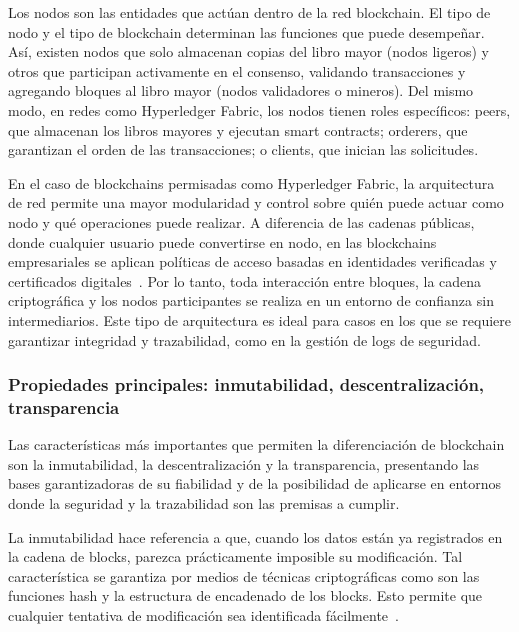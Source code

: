 Los nodos son las entidades que actúan dentro de la red blockchain. El tipo de nodo y el tipo de blockchain determinan las funciones que puede desempeñar. Así, existen nodos que solo almacenan copias del libro mayor (nodos ligeros) y otros que participan activamente en el consenso, validando transacciones y agregando bloques al libro mayor (nodos validadores o mineros)\cite{Swan2015}. Del mismo modo, en redes como Hyperledger Fabric, los nodos tienen roles específicos: peers, que almacenan los libros mayores y ejecutan smart contracts; orderers, que garantizan el orden de las transacciones; o clients, que inician las solicitudes\cite{HyperledgerFabric2.5KeyConcepts}.

En el caso de blockchains permisadas como Hyperledger Fabric, la arquitectura de red permite una mayor modularidad y control sobre quién puede actuar como nodo y qué operaciones puede realizar. A diferencia de las cadenas públicas, donde cualquier usuario puede convertirse en nodo, en las blockchains empresariales se aplican políticas de acceso basadas en identidades verificadas y certificados digitales~\cite{HyperledgerFabric2.5KeyConcepts}. Por lo tanto, toda interacción entre bloques, la cadena criptográfica y los nodos participantes se realiza en un entorno de confianza sin intermediarios. Este tipo de arquitectura es ideal para casos en los que se requiere garantizar integridad y trazabilidad, como en la gestión de logs de seguridad.



\subsubsection{Propiedades principales: inmutabilidad, descentralización, transparencia}

Las características más importantes que permiten la diferenciación de blockchain son la inmutabilidad, la descentralización y la transparencia, presentando las bases garantizadoras de su fiabilidad y de la posibilidad de aplicarse en entornos donde la seguridad y la trazabilidad son las premisas a cumplir.

La inmutabilidad hace referencia a que, cuando los datos están ya registrados en la cadena de blocks, parezca prácticamente imposible su modificación. Tal característica se garantiza por medios de técnicas criptográficas como son las funciones hash y la estructura de encadenado de los blocks. Esto permite que cualquier tentativa de modificación sea identificada fácilmente~\cite{Stallings2017}.

